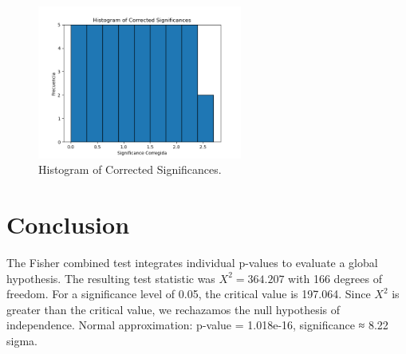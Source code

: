\documentclass[12pt]{article}
\begin{document}
\begin{figure}[h!]
\centering
\includegraphics[width=0.6\textwidth]{corrected_significance_hist.png}
\caption{Histogram of Corrected Significances.}
\end{figure}

\section*{Conclusion}
The Fisher combined test integrates individual p-values to evaluate a global hypothesis.
The resulting test statistic was $X^2 = 364.207$ with 166 degrees of freedom.
For a significance level of 0.05, the critical value is 197.064.
Since $X^2$ is greater than the critical value, we rechazamos the null hypothesis of independence.
Normal approximation: p-value = 1.018e-16, significance ≈ 8.22 sigma.
\end{document}
